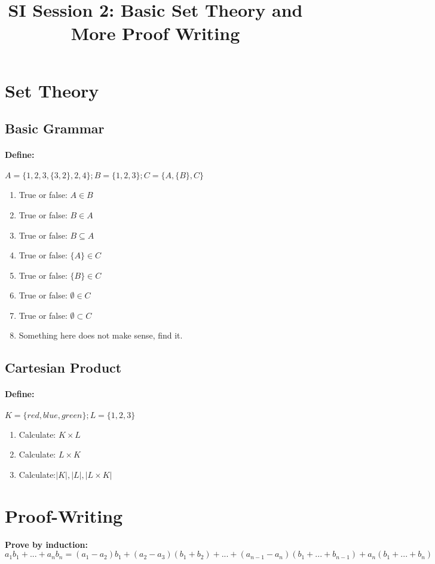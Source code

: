 \documentclass[12pt]{article}
\date{}
\author{}
\title{SI Session 2: Basic Set Theory and More Proof Writing}
\begin{document}
	\maketitle

\section{Set Theory}
	\subsection{Basic Grammar}
	\paragraph{Define: } $A =\{1,2,3,\{3,2\},2,4\};   B=\{1,2,3\}; C=\{A,\{B\},C\}$
	\begin{enumerate}
	\item True or false: $A \in B$
	\item True or false: $B \in A$
	\item True or false: $B \subseteq A$
	\item True or false: $\{A\}\in C$
	\item True or false: $\{B\} \in C$
	\item True or false: $\emptyset \in C$
	\item True or false: $\emptyset \subset C$
	\item Something here does not make sense, find it.
	\end{enumerate} 
	\subsection{Cartesian Product}
	\paragraph{Define: } $K=\{red, blue, green\}; L=\{1,2,3\}$
	\begin{enumerate}[resume] 
	\item Calculate: $K \times L$
	\item Calculate: $L \times K$
	\item Calculate:$ |K|, |L|, |L\times K|$
	\end{enumerate}
\section{Proof-Writing}
	\textbf{Prove by induction: } \\ \small $a_1 b_1+...+a_n b_n=(a_1-a_2)b_1+(a_2-a_3)(b_1+b_2)+...+(a_{n-1} - a_n)(b_1+...+b_{n-1})+a_n(b_1+...+b_n)$
\end{document}
